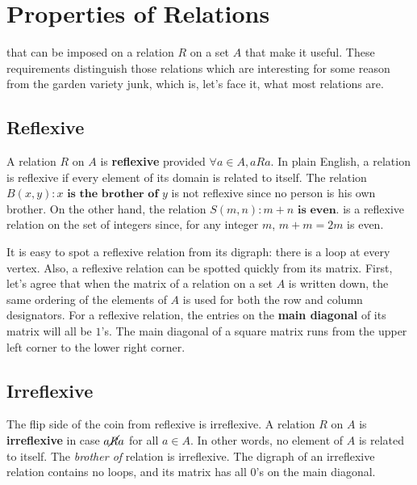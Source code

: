 \chapter{Properties of Relations}

 that can be imposed on a relation $R$ on a set  
$A$ that make it 
useful.  These requirements distinguish those relations which are interesting 
for some reason from
the garden variety junk, which is, let's face it,  what most relations are. 

\section{Reflexive} 
A relation $R$ on $A$ is {\bfseries reflexive} provided $\forall a\in A, aRa.$
In plain English, a relation is reflexive if every element of its domain is related to
itself. The relation $B(x,y) : x \textbf{ is the brother of } y$ is not 
reflexive since no person is his own brother. On the other hand, the relation
$S(m,n) : m+n \textbf{ is even}$.  is a reflexive relation on the set of integers
since, for any integer $m$, $m+m=2m$ is even.

It is easy to spot a reflexive relation from its digraph:  there is a loop at every vertex.
Also, a reflexive relation can be spotted quickly from its matrix. First, let's agree
that when the matrix of a relation on a set $A$ is written down, the same ordering
of the elements of $A$ is used for both the row and column designators.  For a 
reflexive relation, the entries on the {\bfseries main diagonal} of its matrix
will all be $1$'s. The main diagonal of a square matrix runs from the upper
left corner to the lower right corner.

\section{Irreflexive} 
The flip side of the coin from reflexive is irreflexive.
A relation $R$ on $A$ is {\bfseries irreflexive} in case $a{\cancel{R}}a$ for all $a\in A$.
In other words, no element of $A$ is related to itself. The {\itshape brother of} relation
is irreflexive. 
The digraph of an irreflexive relation  contains no loops, and its matrix has all $0$'s 
on the main diagonal.

